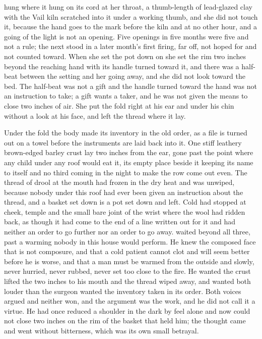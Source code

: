  hung where it hung on its cord at her throat, a thumb-length of lead-glazed clay with the Vail kiln scratched into it under a working thumb, and she did not touch it, because the hand goes to the mark before the kiln and at no other hour, and a going of the light is not an opening. Five openings in five months were five and not a rule; the next stood in a later month's first firing, far off, not hoped for and not counted toward. When she set the pot down on  she set the rim two inches beyond the reaching hand with its handle turned toward it, and there was a half-beat between the setting and her going away, and she did not look toward the bed. The half-beat was not a gift and the handle turned toward the hand was not an instruction to take; a gift wants a taker, and he was not given the means to close two inches of air. She put the fold right at his ear and under his chin without a look at his face, and left the thread where it lay.

Under the fold the body made its inventory in the old order, as a file is turned out on a towel before the instruments are laid back into it. One stiff leathery brown-edged barley crust lay two inches from the ear, gone past the point where any child under any roof would eat it, its empty place beside it keeping its name to itself and no third coming in the night to make the row come out even. The thread of drool at the mouth had frozen in the dry heat and was unwiped, because nobody under this roof had ever been given an instruction about the thread, and a basket set down is a pot set down and left. Cold had stopped at cheek, temple and the small bare joint of the wrist where the wool had ridden back, as though it had come to the end of a line written out for it and had neither an order to go further nor an order to go away.  waited beyond all three, past a warming nobody in this house would perform. He knew the composed face that is not composure, and that a cold patient cannot clot and will seem better before he is worse, and that a man must be warmed from the outside and slowly, never hurried, never rubbed, never set too close to the fire. He wanted the crust lifted the two inches to his mouth and the thread wiped away, and wanted both louder than the surgeon wanted the inventory taken in its order. Both voices argued and neither won, and the argument was the work, and he did not call it a virtue. He had once reduced a shoulder in the dark by feel alone and now could not close two inches on the rim of the basket that held him; the thought came and went without bitterness, which was its own small betrayal.

